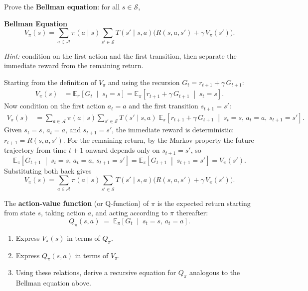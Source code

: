 \documentclass[11pt]{article}
\newcommand{\cS}{\mathcal{S}}
\newcommand{\cA}{\mathcal{A}}
\begin{document}
\begin{exercise}
\label{prob:bellman_proof} Prove the \textbf{Bellman equation}: for all $s \in \cS$,
\begin{callout}[note]
\textbf{Bellman Equation}
$$
V_\pi(s) = \sum_{a \in \cA} \pi(a \mid s) \sum_{s' \in \cS} T(s' \mid s, a)\bigl(R(s,a,s') + \gamma\, V_\pi(s')\bigr).
$$
\end{callout}
\textit{Hint:} condition on the first action and the first transition, then separate the immediate reward from the remaining return.
\end{exercise}

\begin{solution}
Starting from the definition of $V_\pi$ and using the recursion $G_t = r_{t+1} + \gamma\, G_{t+1}$:
\begin{align*}
V_\pi(s) &= \mathbb{E}_\pi\!\left[G_t \;\middle|\; s_t = s\right] = \mathbb{E}_\pi\!\left[r_{t+1} + \gamma\, G_{t+1} \;\middle|\; s_t = s\right].
\end{align*}
Now condition on the first action $a_t = a$ and the first transition $s_{t+1} = s'$:
\begin{align*}
V_\pi(s) &= \sum_{a \in \cA} \pi(a \mid s) \sum_{s' \in \cS} T(s' \mid s, a) \;\mathbb{E}_\pi\!\left[r_{t+1} + \gamma\, G_{t+1} \;\middle|\; s_t = s,\, a_t = a,\, s_{t+1} = s'\right].
\end{align*}
Given $s_t = s$, $a_t = a$, and $s_{t+1} = s'$, the immediate reward is deterministic: $r_{t+1} = R(s, a, s')$. For the remaining return, by the Markov property the future trajectory from time $t+1$ onward depends only on $s_{t+1} = s'$, so
$$
\mathbb{E}_\pi\!\left[G_{t+1} \;\middle|\; s_t = s,\, a_t = a,\, s_{t+1} = s'\right] = \mathbb{E}_\pi\!\left[G_{t+1} \;\middle|\; s_{t+1} = s'\right] = V_\pi(s').
$$
Substituting both back gives
$$
V_\pi(s) = \sum_{a \in \cA} \pi(a \mid s) \sum_{s' \in \cS} T(s' \mid s, a)\bigl(R(s,a,s') + \gamma\, V_\pi(s')\bigr).
$$
\end{solution}

\begin{definition}\label{def:q_function}
The \textbf{action-value function} (or Q-function) of $\pi$ is the expected return starting from state $s$, taking action $a$, and acting according to $\pi$ thereafter:
$$
Q_\pi(s,a) \;=\; \mathbb{E}_\pi\!\left[G_t \;\middle|\; s_t = s,\, a_t = a\right].
$$
\end{definition}

\begin{exercise}
\label{prob:q_function}
\begin{enumerate}
\item\label{prob:Vpi_from_Qpi} Express $V_\pi(s)$ in terms of $Q_\pi$.
\item\label{prob:Qpi_from_Vpi} Express $Q_\pi(s,a)$ in terms of $V_\pi$.
\item\label{prob:bellman_Q} Using these relations, derive a recursive equation for $Q_\pi$ analogous to the Bellman equation above.
\end{enumerate}
\end{exercise}
\end{document}
